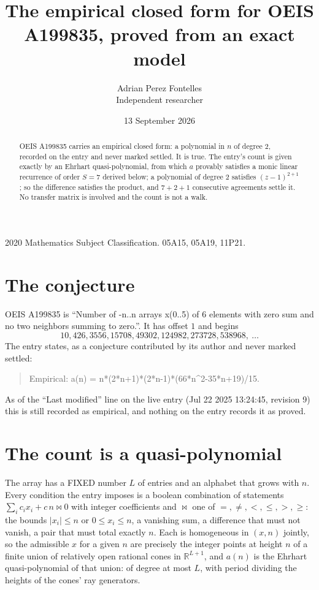 \documentclass[11pt,a4paper]{article}
\title{The empirical closed form for OEIS A199835, proved from an exact model}
\author{Adrian Perez Fontelles\\ \small Independent researcher}
\date{13 September 2026}
\theoremstyle{plain}
\theoremstyle{definition}
\begin{document}
\maketitle

\begin{abstract}
OEIS A199835 carries an empirical closed form: a polynomial in $n$ of degree $2$, recorded on the
entry and never marked settled. It is true. The entry's count is given exactly by an Ehrhart
quasi-polynomial, from which $a$ provably satisfies a monic linear recurrence of order $S=7$
derived below; a polynomial of degree $2$ satisfies $(z-1)^{2+1}$; so the difference
satisfies the product, and $7+2+1$ consecutive agreements settle it. No transfer matrix is
involved and the count is not a walk.
\end{abstract}

\noindent\small 2020 Mathematics Subject Classification. 05A15, 05A19, 11P21.\normalsize

\section{The conjecture}

OEIS A199835 is ``Number of -n..n arrays x(0..5) of 6 elements with zero sum and no two neighbors summing to zero.''. It has offset $1$ and begins
\[
10, 426, 3556, 15708, 49302, 124982, 273728, 538968,\ \dots
\]
The entry states, as a conjecture contributed by its author and never marked settled:
\begin{quote}
Empirical: a(n) = n*(2*n+1)*(2*n-1)*(66*n\^{}2-35*n+19)/15.
\end{quote}
As of the ``Last modified'' line on the live entry (Jul 22 2025 13:24:45, revision 9)
this is still recorded as empirical, and nothing on the entry records it as proved.

\section{The count is a quasi-polynomial}

The array has a FIXED number $L$ of entries and an alphabet that grows with $n$. Every
condition the entry imposes is a boolean combination of statements
$\sum_i c_ix_i + c\,n \bowtie 0$ with integer coefficients and $\bowtie$ one of
$=,\ne,<,\le,>,\ge$: the bounds $|x_i|\le n$ or $0\le x_i\le n$, a vanishing sum, a difference
that must not vanish, a pair that must total exactly $n$. Each is homogeneous in $(x,n)$
jointly, so the admissible $x$ for a given $n$ are precisely the integer points at height $n$
of a finite union of relatively open rational cones in $\mathbb{R}^{L+1}$, and $a(n)$ is
the Ehrhart quasi-polynomial of that union: of degree at most $L$, with period dividing the
heights of the cones' ray generators.
\end{document}
